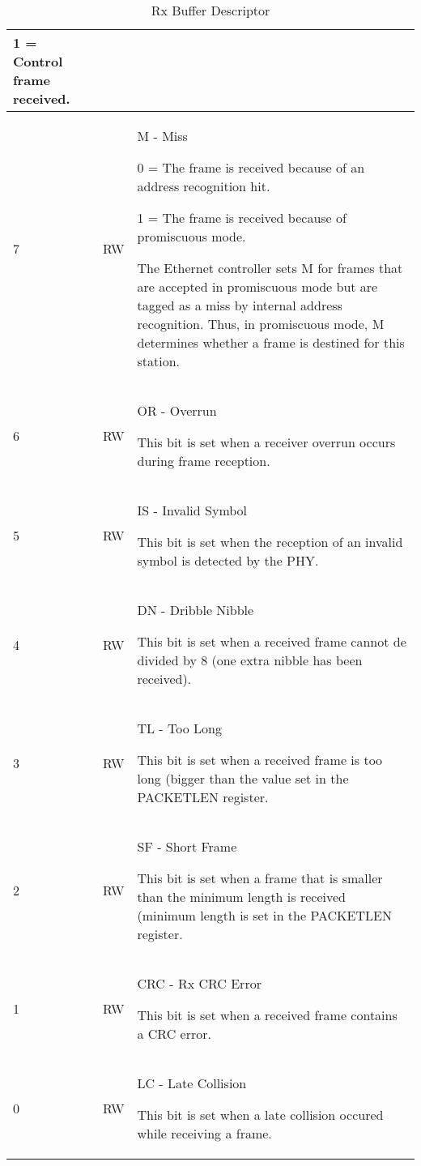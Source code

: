\begin{table}[H]
\begin{tabularx}{\textwidth}{|l|l|X|}
                1 = Control frame received. \\ \hline
    \rowcolor{iob-blue}
    7       & RW & M - Miss

                0 = The frame is received because of an address recognition
                hit.

                1 = The frame is received because of promiscuous mode.

                The Ethernet controller sets M for frames that are accepted in
                promiscuous mode but are tagged as a miss by internal address
                recognition. Thus, in promiscuous mode, M determines whether a
                frame is destined for this station.\\ \hline
    6       & RW & OR - Overrun

                This bit is set when a receiver overrun occurs during frame
                reception.\\ \hline
    \rowcolor{iob-blue}
    5       & RW & IS - Invalid Symbol

                This bit is set when the reception of an invalid symbol is
                detected by the PHY.\\ \hline
    4       & RW & DN - Dribble Nibble

                This bit is set when a received frame cannot de divided by 8
                (one extra nibble has been received).\\ \hline
    \rowcolor{iob-blue}
    3       & RW & TL - Too Long

                This bit is set when a received frame is too long (bigger than
                the value set in the PACKETLEN register.\\ \hline
    2       & RW & SF - Short Frame

                This bit is set when a frame that is smaller than the minimum
                length is received (minimum length is set in the PACKETLEN
                register.\\ \hline
    \rowcolor{iob-blue}
    1       & RW & CRC - Rx CRC Error

                This bit is set when a received frame contains a CRC error.\\
                \hline
    0       & RW & LC - Late Collision

                This bit is set when a late collision occured while receiving a
                frame.\\ \hline
  \end{tabularx}
    \caption{Rx Buffer Descriptor}
  \label{buffer_descriptors:rx}
\end{table}
